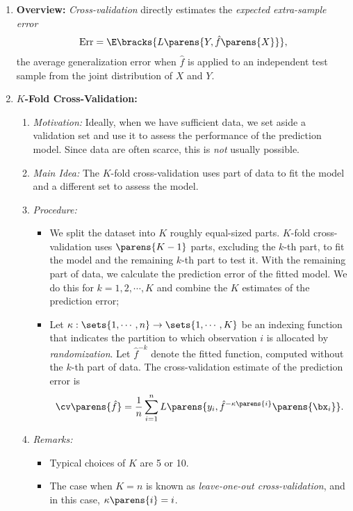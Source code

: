 \documentclass[12pt]{article}
\begin{document}
\begin{enumerate}[label=\textbf{\arabic*.}]
	
	\item \textbf{Overview:} \emph{Cross-validation} directly estimates the \textit{expected extra-sample error} 
	\begin{align*}
		\mathrm{Err} = \E \bracks{L \parens{Y, \hat{f} \parens{X}}}, 
	\end{align*}
	the average generalization error when $\hat{f}$ is applied to an independent test sample from the joint distribution of $X$ and $Y$. 
	
	\item \textbf{$K$-Fold Cross-Validation:} 
	\begin{enumerate}
		\item \textit{Motivation:} Ideally, when we have sufficient data, we set aside a validation set and use it to assess the performance of the prediction model. Since data are often scarce, this is \emph{not} usually possible. 
		\item \textit{Main Idea:} The $K$-fold cross-validation uses part of data to fit the model and a different set to assess the model. 
		\item \textit{Procedure:} 
		\begin{itemize}
			\item We split the dataset into $K$ roughly equal-sized parts. $K$-fold cross-validation uses $\parens{K-1}$ parts, excluding the $k$-th part, to fit the model and the remaining $k$-th part to test it. With the remaining part of data, we calculate the prediction error of the fitted model. We do this for $k = 1, 2, \cdots, K$ and combine the $K$ estimates of the prediction error; 
			\item Let $\kappa: \sets{ 1, \cdots, n } \to \sets{ 1, \cdots, K }$ be an indexing function that indicates the partition to which observation $i$ is allocated by \textit{randomization}. Let $\hat{f}^{-k}$ denote the fitted function, computed without the $k$-th part of data. The cross-validation estimate of the prediction error is 
			\begin{equation}
				\cv \parens{\hat{f}} = \frac{1}{n} \sum_{i=1}^n L \parens{y_i, \hat{f}^{-\kappa \parens{i}} \parens{\bx_i}}. 
			\end{equation}
		\end{itemize} 
		\item \textit{Remarks:}
		\begin{itemize}
			\item Typical choices of $K$ are 5 or 10. 
			\item The case when $ K = n $ is known as \textit{leave-one-out cross-validation}, and in this case, $\kappa \parens{i} = i$. 
		\end{itemize}


\end{enumerate}
\end{enumerate}
\end{document}
